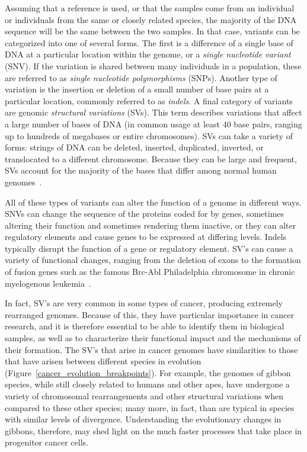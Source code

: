 Assuming that a reference is used, or that the samples come from an individual or individuals from the same or closely related species, the majority of the DNA sequence will be the same between the two samples. In that case, variants can be categorized into one of several forms. The first is a difference of a single base of DNA at a particular location within the genome, or a \emph{single nucleotide variant} (SNV). If the variation is shared between many individuals in a population, these are referred to as \emph{single nucleotide polymorphisms} (SNPs). Another type of variation is the insertion or deletion of a small number of base pairs at a particular location, commonly referred to as \emph{indels}. A final category of variants are genomic \emph{structural variations} (SVs). This term describes variations that affect a large number of bases of DNA (in common usage at least 40 base pairs, ranging up to hundreds of megabases or entire chromosomes). SVs can take a variety of forms: strings of DNA can be deleted, inserted, duplicated, inverted, or translocated to a different chromosome. Because they can be large and frequent, SVs account for the majority of the bases that differ among normal human genomes~\cite{Mills:2011p1611, Conrad:2010ja}.

All of these types of variants can alter the function of a genome in different ways. SNVs can change the sequence of the proteins coded for by genes, sometimes altering their function and sometimes rendering them inactive, or they can alter regulatory elements and cause genes to be expressed at differing levels. Indels typically disrupt the function of a gene or regulatory element. SV's can cause a variety of functional changes, ranging from the deletion of exons to the formation of fusion genes such as the famous Brc-Abl Philadelphia chromosome in chronic myelogenous leukemia~\cite{Kurzrock:2003bz}. 

In fact, SV's are very common in some types of cancer, producing extremely rearranged genomes. Because of this, they have particular importance in cancer research, and it is therefore essential to be able to identify them in biological samples, as well as to characterize their functional impact and the mechanisms of their formation. The SV's that arise in cancer genomes have similarities to those that have arisen between different species in evolution (Figure~\ref{cancer_evolution_breakpoints}). For example, the genomes of gibbon species, while still closely related to humans and other apes, have undergone a variety of chromosomal rearrangements and other structural variations when compared to these other species; many more, in fact, than are typical in species with similar levels of divergence. Understanding the evolutionary changes in gibbons, therefore, may shed light on the much faster processes that take place in progenitor cancer cells.

